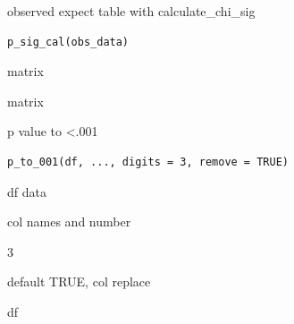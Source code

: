 \documentclass[a4paper]{book}
\begin{document}
%
\begin{Description}
observed expect table with calculate\_chi\_sig
\end{Description}
%
\begin{Usage}
\begin{verbatim}
p_sig_cal(obs_data)
\end{verbatim}
\end{Usage}
%
\begin{Arguments}
\begin{ldescription}
\item[\code{obs\_data}] matrix
\end{ldescription}
\end{Arguments}
%
\begin{Value}
matrix
\end{Value}
%
\begin{Description}
p value  to <.001
\end{Description}
%
\begin{Usage}
\begin{verbatim}
p_to_001(df, ..., digits = 3, remove = TRUE)
\end{verbatim}
\end{Usage}
%
\begin{Arguments}
\begin{ldescription}
\item[\code{df}] df data

\item[\code{...}] col names and number

\item[\code{digits}] 3

\item[\code{remove}] default TRUE, col replace
\end{ldescription}
\end{Arguments}
%
\begin{Value}
df
\end{Value}
%
\end{document}
